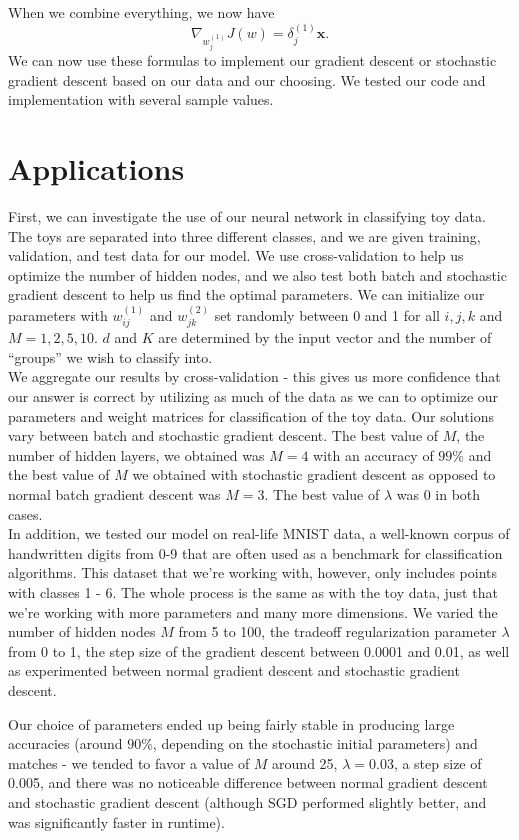 \documentclass[11pt,letterpaper]{article}
\begin{document}
When we combine everything, we now have
$$\nabla_{w^{(1)}_j}J(w)=\delta_j^{(1)}\textbf{x}.$$
We can now use these formulas to implement our gradient descent or stochastic gradient descent based on our data and our choosing. We tested our code and implementation with several sample values.

\section{Applications}
First, we can investigate the use of our neural network in classifying toy data. The toys are separated into three different classes, and we are given training, validation, and test data for our model. We use cross-validation to help us optimize the number of hidden nodes, and we also test both batch and stochastic gradient descent to help us find the optimal parameters. We can initialize our parameters with $w^{(1)}_{ij}$ and $w^{(2)}_{jk}$ set randomly between 0 and 1 for all $i,j,k$ and $M=1,2,5,10$. $d$ and $K$ are determined by the input vector and the number of ``groups'' we wish to classify into.\\

We aggregate our results by cross-validation - this gives us more confidence that our answer is correct by utilizing as much of the data as we can to optimize our parameters and weight matrices for classification of the toy data. Our solutions vary between batch and stochastic gradient descent. The best value of $M$, the number of hidden layers, we obtained was $M=4$ with an accuracy of $99\%$ and the best value of $M$ we obtained with stochastic gradient descent as opposed to normal batch gradient descent was $M=3$. The best value of $\lambda$ was 0 in both cases.\\

In addition, we tested our model on real-life MNIST data, a well-known corpus of handwritten digits from 0-9 that are often used as a benchmark for classification algorithms. This dataset that we're working with, however, only includes points with classes 1 - 6. The whole process is the same as with the toy data, just that we're working with more parameters and many more dimensions. We varied the number of hidden nodes $M$ from 5 to 100, the tradeoff regularization parameter $\lambda$ from 0 to 1, the step size of the gradient descent between 0.0001 and 0.01, as well as experimented between normal gradient descent and stochastic gradient descent.

Our choice of parameters ended up being fairly stable in producing large accuracies (around $90\%$, depending on the stochastic initial parameters) and matches - we tended to favor a value of $M$ around 25, $\lambda=0.03$, a step size of 0.005, and there was no noticeable difference between normal gradient descent and stochastic gradient descent (although SGD performed slightly better, and was significantly faster in runtime).
\end{document}
